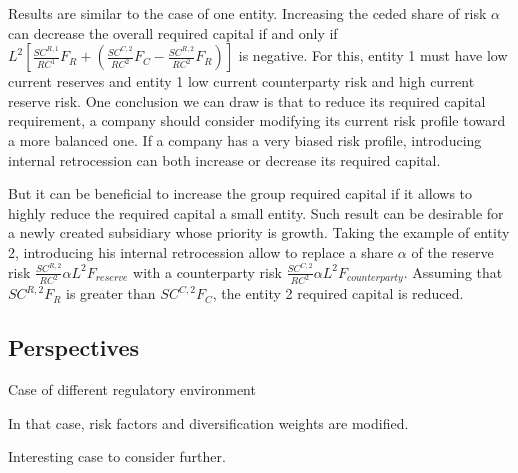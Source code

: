 Results are similar to the case of one entity. Increasing the ceded share of risk $\alpha$ can decrease the overall required capital if and only if $L^2 \left[ \frac{SC^{R,1}}{RC^1} F_{R} + \left(\frac{SC^{C,2}}{RC^2} F_{C} - \frac{SC^{R,2}}{RC^2} F_{R} \right) \right]$ is negative. For this, entity 1 must have low current reserves and entity 1 low current counterparty risk and high current reserve risk. 
One conclusion we can draw is that to reduce its required capital requirement, a company should consider modifying its current risk profile toward a more balanced one. If a company has a very biased risk profile, introducing internal retrocession can both increase or decrease its required capital.


But it can be beneficial to increase the group required capital if it allows to highly reduce the required capital a small entity. Such result can be desirable for a newly created subsidiary whose priority is growth.
Taking the example of entity 2, introducing his internal retrocession allow to replace a share $\alpha$ of the reserve risk $\frac{SC^{R,2}}{RC^2}\alpha L^2 F_{reserve}$ with a counterparty risk $\frac{SC^{C,2}}{RC^2}\alpha L^2 F_{counterparty}$. Assuming that $SC^{R,2} F_R$ is greater than $SC^{C,2} F_C$, the entity 2 required capital is reduced.

\subsection{Perspectives}

Case of different regulatory environment

In that case, risk factors and diversification weights are modified.

Interesting case to consider further.

